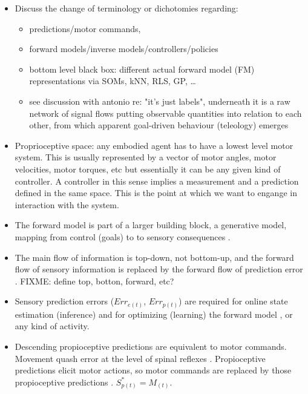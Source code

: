 \documentclass[11pt]{llncs}
\begin{document}
\begin{itemize}

\item Discuss the change of terminology or dichotomies regarding:
  \begin{itemize}
  \item predictions/motor commands,
  \item forward models/inverse models/controllers/policies
  \item bottom level black box: different actual forward model (FM)
    representations via SOMs, kNN, RLS, GP, \ldots{}
  \item see discussion with antonio re: "it's just labels", underneath it is a raw
    network of signal flows putting observable quantities into
    relation to each other, from which apparent goal-driven behaviour
    (teleology) emerges
  \end{itemize}


\item Proprioceptive space: any embodied agent has to have a lowest
  level motor system. This is usually represented by a vector of motor
  angles, motor velocities, motor torques, etc but essentially it can be any
  given kind of controller. A controller in this sense implies a
  measurement and a prediction defined in the same space. This is the
  point at which we want to engange in interaction with the
  system.

\item The forward model is part of a larger building block, a
  generative model, mapping from control (goals) to to sensory
  consequences \citep{friston2011}.

\item The main flow of information is top-down, not bottom-up, and the
  forward flow of sensory information is replaced by the forward flow
  of prediction error \citep{clark2015}. FIXME: define top, botton,
  forward, etc?

\item Sensory prediction errors ($Err_{e(t)}$, $Err_{p(t)}$) are
  required for online state estimation (inference) and for optimizing
  (learning) the forward model \citep{friston2011}, or any kind of
  activity. 

\item Descending propioceptive predictions are equivalent to motor
  commands. Movement quash error at the level of spinal reflexes
  \citep{pickering2014}. Propioceptive predictions elicit motor
  actions, so motor commands are replaced by those
  propioceptive predictions \citep{clark2015}. $S^*_{p(t)}=M_{(t)}$.


\end{itemize}
\end{document}
